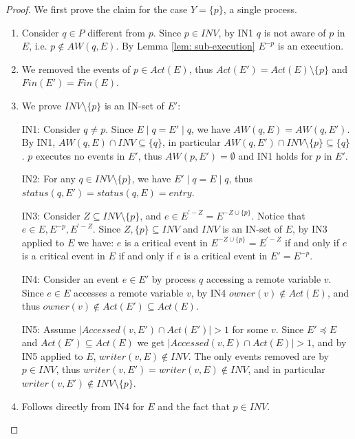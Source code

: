 \begin{proof}  \mbox{}
	
	We first prove the claim for the case $Y = \{p\}$, a single process.
\begin{enumerate}
	
\item
	Consider $q \in P$ different from $p$. Since $p \in INV$, by IN1 $q$ is not aware of $p$ in $E$, i.e. $p \notin AW(q,E)$. By Lemma \ref{lem: sub-execution} $E^{-p}$ is an execution.
	
\item
	We removed the events of $p \in Act(E)$, thus $Act(E') = Act(E) \setminus \{p\}$ and $Fin(E') = Fin(E)$.
	
\item
	We prove $INV \setminus \{p\}$ is an IN-set of $E'$:
	
	IN1: Consider $q \neq p$. Since $E \mid q = E' \mid q$, we have $AW(q,E) = AW(q,E')$. By IN1, $AW(q,E) \cap INV \subseteq \{q\}$, in particular $AW(q,E') \cap INV \setminus \{p\} \subseteq \{q\}$. $p$ executes no events in $E'$, thus $AW(p,E') = \emptyset$ and IN1 holds for $p$ in $E'$.
	
	IN2: For any $q \in INV \setminus \{p\}$, we have $E' \mid q = E \mid q$, thus $status(q,E') = status(q,E) = entry$.
	
	IN3: Consider $Z \subseteq INV \setminus \{p\}$, and $e \in E^{'-Z} = E^{-Z \cup \{p\}}$. Notice that $e \in E, E^{-p}, E^{'-Z}$.  Since $Z, \{p\} \subseteq INV$ and $INV$ is an IN-set of $E$, by IN3 applied to $E$ we have: $e$ is a critical event in $E^{-Z \cup \{p\}} = E^{'-Z}$ if and only if $e$ is a critical event in $E$ if and only if $e$ is a critical event in $E' = E^{-p}$.
	
	IN4: Consider an event $e \in E'$ by process $q$ accessing a remote variable $v$. Since $e \in E$ accesses a remote variable $v$, by IN4 $owner(v) \notin Act(E)$, and thus $owner(v) \notin Act(E') \subseteq Act(E)$.
	
	IN5: Assume $|Accessed(v,E') \cap Act(E')| > 1$ for some $v$. Since $E' \preceq E$ and $Act(E') \subseteq Act(E)$ we get $|Accessed(v,E) \cap Act(E)| > 1$, and by IN5 applied to $E$, $writer(v,E) \notin INV$. The only events removed are by $p \in INV$, thus $writer(v,E') = writer(v,E) \notin INV$, and in particular $writer(v,E') \notin INV \setminus \{p\}$.
	
\item
	Follows directly from IN4 for $E$ and the fact that $p \in INV$.
	

\end{enumerate}
\end{proof}

